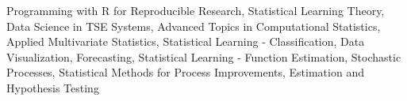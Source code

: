 \documentclass[letterpaper,10pt]{article}
\begin{document}
\vspace{2pt}
{\footnotesize
Programming with R for Reproducible Research, 
Statistical Learning Theory, 
Data Science in TSE Systems,
Advanced Topics in Computational Statistics, 
Applied Multivariate Statistics,
Statistical Learning - Classification, 
Data Visualization,
Forecasting, 
Statistical Learning - Function Estimation, 
Stochastic Processes,
Statistical Methods for Process Improvements,
Estimation and Hypothesis Testing
}
\end{document}
